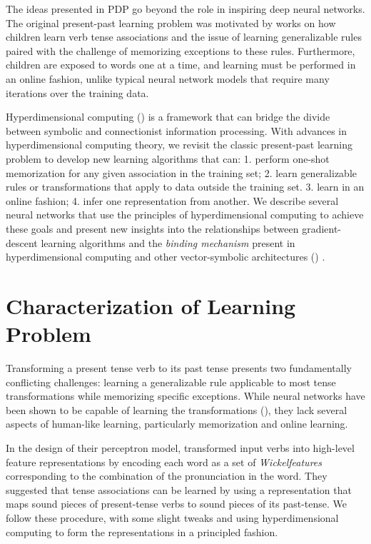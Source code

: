 \documentclass{article}
\begin{document}
The ideas presented in PDP go beyond the role in inspiring deep neural networks. The original present-past learning problem was motivated by works on how children learn verb tense associations and the issue of learning generalizable rules paired with the challenge of memorizing exceptions to these rules. Furthermore, children are exposed to words one at a time, and learning must be performed in an online fashion, unlike typical neural network models that require many iterations over the training data.

Hyperdimensional computing (\citet{Kanerva2009}) is a framework that can bridge the divide between symbolic and connectionist information processing. With advances in hyperdimensional computing theory, we revisit the classic present-past learning problem to develop new learning algorithms that can: 1. perform one-shot memorization for any given association in the training set; 2. learn generalizable rules or transformations that apply to data outside the training set. 3. learn in an online fashion; 4. infer one representation from another. We describe several neural networks that use the principles of hyperdimensional computing to achieve these goals and present new insights into the relationships between gradient-descent learning algorithms and the \emph{binding mechanism} present in hyperdimensional computing and other vector-symbolic architectures (\citet{Gayler2003}) .

\section{Characterization of Learning Problem}

Transforming a present tense verb to its past tense presents two fundamentally conflicting challenges: learning a generalizable rule applicable to most tense transformations while memorizing specific exceptions. While neural networks have been shown to be capable of learning the transformations (\citet{MacWhinney1991}), they lack several aspects of human-like learning, particularly memorization and online learning. 

In the design of their perceptron model, \citet{Rumelhart1986} transformed input verbs into high-level feature representations by encoding each word as a set of \emph{Wickelfeatures} corresponding to the combination of the pronunciation in the word. They suggested that tense associations can be learned by using a representation that maps sound pieces of present-tense verbs to sound pieces of its past-tense. We follow these procedure, with some slight tweaks and using hyperdimensional computing to form the representations in a principled fashion.
\end{document}
